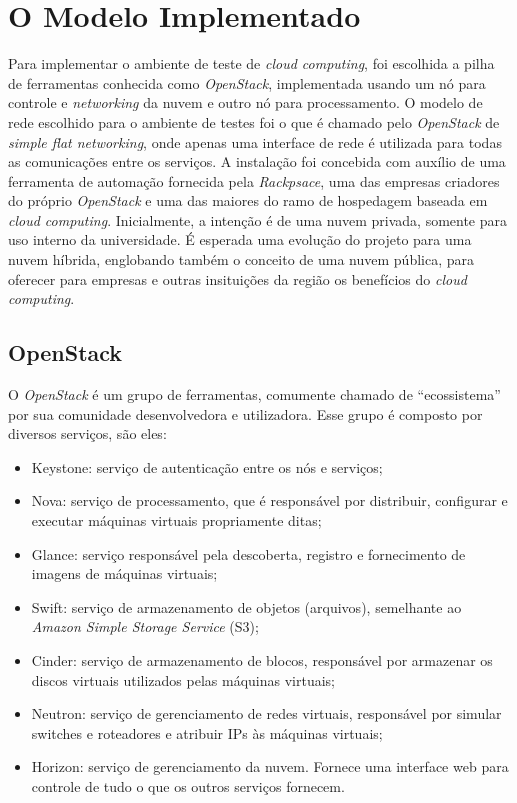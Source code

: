 \chapter{O Modelo Implementado}

Para implementar o ambiente de teste de \emph{cloud computing},
foi escolhida a pilha de ferramentas conhecida
como \emph{OpenStack}, implementada usando um nó para controle e \emph{networking}
da nuvem e outro nó para processamento. O modelo de rede escolhido para o ambiente
de testes foi o que é chamado pelo \emph{OpenStack} de \emph{simple flat networking},
onde apenas uma interface de rede é utilizada para todas as comunicações entre os serviços.
A instalação foi concebida com auxílio de
uma ferramenta de automação fornecida pela \emph{Rackpsace}, uma das empresas
criadores do próprio \emph{OpenStack} e uma das maiores do ramo de hospedagem
baseada em \emph{cloud computing}. Inicialmente, a intenção é de uma
nuvem privada, somente para uso interno da universidade. É esperada
uma evolução do projeto para uma nuvem híbrida, englobando também o conceito
de uma nuvem pública, para oferecer para empresas e outras insituições da região
os benefícios do \emph{cloud computing}.

\section{OpenStack}

O \emph{OpenStack} é um grupo de ferramentas, comumente chamado de ``ecossistema''
por sua comunidade desenvolvedora e utilizadora. Esse grupo é composto por
diversos serviços, são eles:

\begin{itemize}
    \item
        Keystone: serviço de autenticação entre os nós e serviços;

    \item
        Nova: serviço de processamento, que é responsável por distribuir,
        configurar e executar máquinas virtuais propriamente ditas;

    \item
        Glance: serviço responsável pela descoberta, registro e fornecimento
        de imagens de máquinas virtuais;

    \item
        Swift: serviço de armazenamento de objetos (arquivos), semelhante
        ao \emph{Amazon Simple Storage Service} (S3);

    \item
        Cinder: serviço de armazenamento de blocos, responsável por armazenar
        os discos virtuais utilizados pelas máquinas virtuais;

    \item
        Neutron: serviço de gerenciamento de redes virtuais, responsável
        por simular switches e roteadores e atribuir IPs às máquinas
        virtuais;

    \item
        Horizon: serviço de gerenciamento da nuvem. Fornece uma interface
        web para controle de tudo o que os outros serviços fornecem.
\end{itemize}

